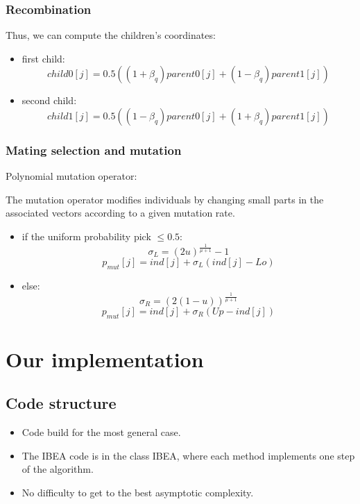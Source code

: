\documentclass{beamer}
\begin{document}
\begin{frame}
\frametitle{Recombination}
Thus, we can compute the children's coordinates:

\begin{itemize}
\item first child:
\begin{equation}
child0[j] = 0.5((1+\beta_q)parent0[j]+(1-\beta_q)parent1[j])
\end{equation}
\item second child:
\begin{equation}
child1[j] = 0.5((1-\beta_q)parent0[j]+(1+\beta_q)parent1[j])
\end{equation}
\end{itemize}

\end{frame}

\begin{frame}
\frametitle{Mating selection and mutation}
Polynomial mutation operator:

The mutation operator modifies individuals by changing small parts in the associated vectors according to a given mutation rate.

\begin{itemize}
\item if the uniform probability pick $\leq 0.5$:
\begin{equation}
\sigma_L = (2u)^{\frac{1}{\mu +1}}-1 
\end{equation}
\begin{equation}
p_{mut}[j] = ind[j] + \sigma_L(ind[j]-Lo)
\end{equation}
\item else:
\begin{equation}
\sigma_R = (2(1-u))^{\frac{1}{\mu +1}} 
\end{equation}
\begin{equation}
p_{mut}[j] = ind[j] + \sigma_R(Up-ind[j])
\end{equation}
\end{itemize}

\end{frame}

\section{Our implementation}
\subsection{Code structure}
\begin{frame}
  \begin{itemize}
    \item Code build for the most general case.
    \item The IBEA code is in the class IBEA, where each method implements one step of the algorithm.
    \item No difficulty to get to the best asymptotic complexity.
  \end{itemize}
\end{frame}
\end{document}
